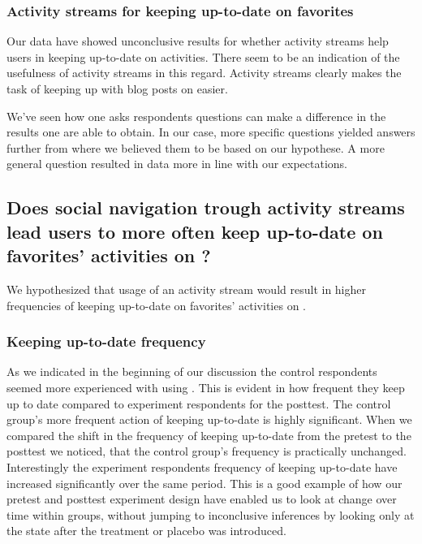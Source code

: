 \subsubsection{Activity streams for keeping up-to-date on favorites}

Our data have showed unconclusive results for whether activity
streams help users in keeping up-to-date on activities. There seem to be an
indication of the usefulness of activity streams in this regard.
Activity streams clearly makes the task of keeping up with blog posts on
\urort{} easier.

We've seen how
one asks respondents questions can make a difference in the results one
are able to obtain. In our case, more specific questions yielded answers
further from where we believed them to be based on our hypothese. A more
general question resulted in data more in line with our expectations.

\subsection{%
  Does social navigation trough activity streams lead users to more often keep
  up-to-date on favorites' activities on \urort{}?
}

We hypothesized that usage of an activity stream would result in higher
frequencies of keeping up-to-date on favorites' activities on \urort{}.

\subsubsection{Keeping up-to-date frequency}

As we indicated in the beginning of our discussion the control respondents
seemed more experienced with using \urort{}. This is evident in how
frequent they keep up to date compared to experiment respondents for the
posttest.%
The control group's more frequent action of keeping up-to-date is highly
significant. When we compared the shift in the frequency of keeping up-to-date
from the pretest to the posttest%
we noticed, that the control group's frequency is practically unchanged.
Interestingly the experiment respondents frequency of keeping up-to-date have
increased significantly over the same period. This is a good example
of how our pretest and posttest experiment design have enabled us to look
at change over time within groups, without jumping to inconclusive inferences
by looking only at the state after the treatment or placebo was introduced.

